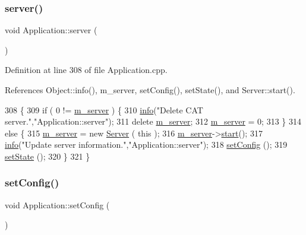 \subsubsection{\texorpdfstring{server()}{server()}}
{\footnotesize\ttfamily void Application\+::server (\begin{DoxyParamCaption}{ }\end{DoxyParamCaption})}



Definition at line 308 of file Application.\+cpp.



References Object\+::info(), m\+\_\+server, set\+Config(), set\+State(), and Server\+::start().


\begin{DoxyCode}
308                             \{
309   \textcolor{keywordflow}{if} ( 0 != \hyperlink{classApplication_a5e6085b0f322d5036177b16113a75b56}{m\_server} ) \{
310     \hyperlink{classObject_a644fd329ea4cb85f54fa6846484b84a8}{info}(\textcolor{stringliteral}{"Delete CAT server."},\textcolor{stringliteral}{"Application::server"});
311     \textcolor{keyword}{delete} \hyperlink{classApplication_a5e6085b0f322d5036177b16113a75b56}{m\_server};
312     \hyperlink{classApplication_a5e6085b0f322d5036177b16113a75b56}{m\_server} = 0;
313   \}
314   \textcolor{keywordflow}{else} \{
315     \hyperlink{classApplication_a5e6085b0f322d5036177b16113a75b56}{m\_server} = \textcolor{keyword}{new} \hyperlink{classServer}{Server} ( \textcolor{keyword}{this} );
316     \hyperlink{classApplication_a5e6085b0f322d5036177b16113a75b56}{m\_server}->\hyperlink{classServer_a039cc5b24c26fa5bb8145335f27bb28e}{start}();
317     \hyperlink{classObject_a644fd329ea4cb85f54fa6846484b84a8}{info}(\textcolor{stringliteral}{"Update server information."},\textcolor{stringliteral}{"Application::server"});
318     \hyperlink{classApplication_a46614964f765fd5374b216582b599bcb}{setConfig} ();
319     \hyperlink{classApplication_a4a86c9bbf7851753c7b2bc03211092fb}{setState}  ();
320   \}
321 \}
\end{DoxyCode}
\mbox{\label{classApplication_a46614964f765fd5374b216582b599bcb}} 
\subsubsection{\texorpdfstring{set\+Config()}{setConfig()}}
{\footnotesize\ttfamily void Application\+::set\+Config (\begin{DoxyParamCaption}{ }\end{DoxyParamCaption})}

